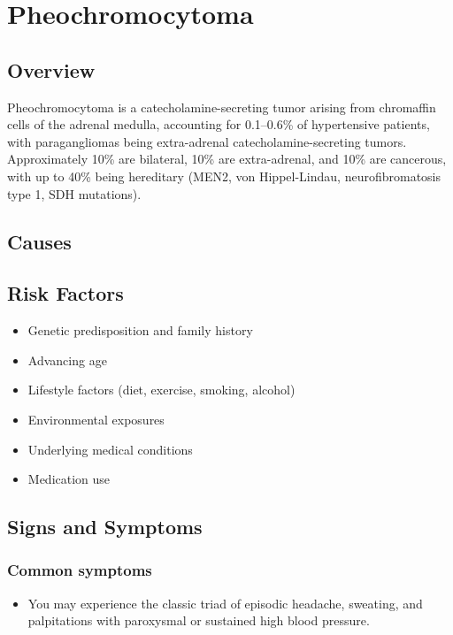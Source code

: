 \chapter{Pheochromocytoma}
\label{sec:Pheochromocytoma}

\section{Overview}
Pheochromocytoma is a catecholamine-secreting tumor arising from chromaffin cells of the adrenal medulla, accounting for 0.1--0.6\% of hypertensive patients, with paragangliomas being extra-adrenal catecholamine-secreting tumors. Approximately 10\% are bilateral, 10\% are extra-adrenal, and 10\% are cancerous, with up to 40\% being hereditary (MEN2, von Hippel-Lindau, neurofibromatosis type 1, SDH mutations).
\section{Causes}
\section{Risk Factors}

\begin{itemize}[noitemsep]
  \item Genetic predisposition and family history
  \item Advancing age
  \item Lifestyle factors (diet, exercise, smoking, alcohol)
  \item Environmental exposures
  \item Underlying medical conditions
  \item Medication use
\end{itemize}
\section{Signs and Symptoms}

\subsection{Common symptoms}
\begin{itemize}[noitemsep]
  \item You may experience the classic triad of episodic headache, sweating, and palpitations with paroxysmal or sustained high blood pressure. 
  \end{itemize}


